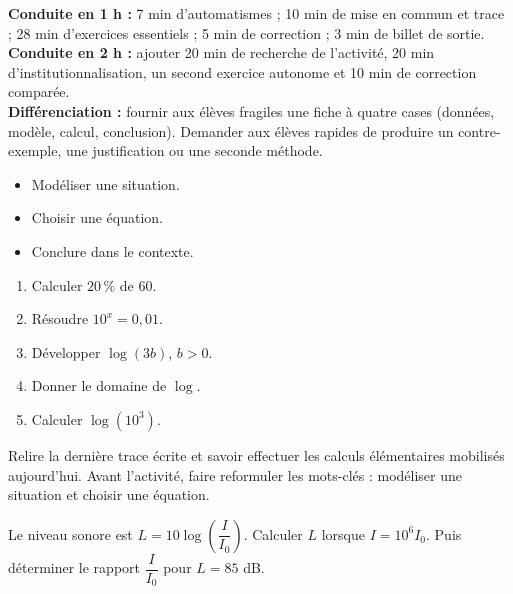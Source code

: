 \ifprof
\begin{methode}
\textbf{Conduite en 1 h :} 7 min d'automatismes ; 10 min de mise en commun et trace ; 28 min d'exercices essentiels ; 5 min de correction ; 3 min de billet de sortie.\\
\textbf{Conduite en 2 h :} ajouter 20 min de recherche de l'activité, 20 min d'institutionnalisation, un second exercice autonome et 10 min de correction comparée.\\
\textbf{Différenciation :} fournir aux élèves fragiles une fiche à quatre cases (données, modèle, calcul, conclusion). Demander aux élèves rapides de produire un contre-exemple, une justification ou une seconde méthode.
\end{methode}
\fi
{}
\begin{objectifs}\begin{itemize}\item Modéliser une situation.\item Choisir une équation.\item Conclure dans le contexte.\end{itemize}\end{objectifs}
\begin{automatismes}\begin{enumerate}\item Calculer $20\,\%$ de $60$. \item Résoudre $10^x=0{,}01$. \item Développer $\log(3b)$, $b>0$. \item Donner le domaine de $\log$. \rep{$]0,+\infty[$}\item Calculer $\log(10^3)$. \end{enumerate}\end{automatismes}
\begin{prerequis}Relire la dernière trace écrite et savoir effectuer les calculs élémentaires mobilisés aujourd'hui. Avant l'activité, faire reformuler les mots-clés : modéliser une situation et choisir une équation.\end{prerequis}

\begin{activite}
Le niveau sonore est $L=10\log\!\left(\dfrac I{I_0}\right)$. Calculer $L$ lorsque $I=10^6I_0$. Puis déterminer le rapport $\dfrac I{I_0}$ pour $L=85$ dB.

\end{activite}

